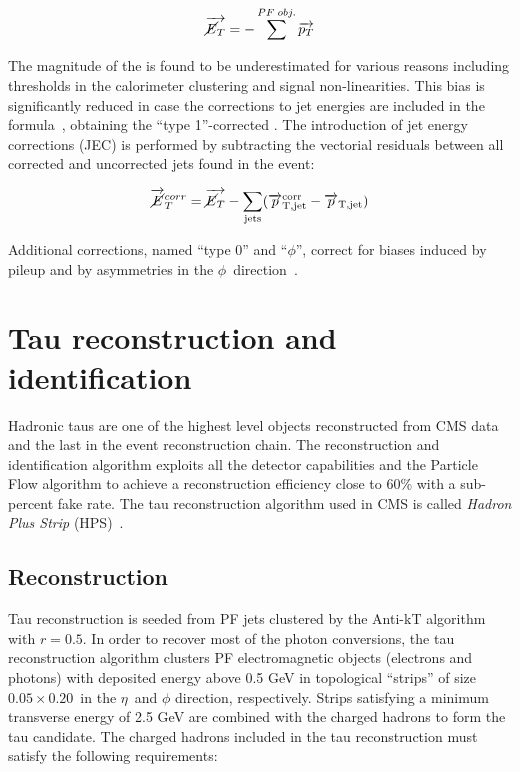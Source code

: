 \begin{equation}
\vec{\cancel{E}_T} = -\sum^{PF\;obj.} \vec{p_{T}}
\end{equation}

The magnitude of the \MET is found to be underestimated for various reasons including thresholds in the calorimeter clustering and signal non-linearities. This bias is significantly reduced in case the corrections to jet energies are included in the formula~\cite{Chatrchyan:2011ds}, obtaining the ``type 1''-corrected \MET. The introduction of jet energy corrections (JEC) is performed by subtracting the vectorial residuals between all corrected and uncorrected jets found in the event:

\begin{equation}
\vec{\cancel{E}}_T^{corr} = \vec{\cancel{E}_T } - \sum_\mathrm{jets} (\vec{p}_\mathrm{T,jet}^\mathrm{corr}-\vec{p}_\mathrm{T,jet})
\label{eq:Type1MET}
\end{equation}

Additional corrections, named ``type 0'' and ``$\phi$'', correct for biases induced by pileup and by asymmetries in the $\phi$\ direction~\cite{AN-13-233}.

\section{Tau reconstruction and identification}
\label{sec:tau_id}

Hadronic taus are one of the highest level objects reconstructed from CMS data and the last in the event reconstruction chain. The reconstruction and identification algorithm exploits all the detector capabilities and the Particle Flow algorithm to achieve a reconstruction efficiency close to 60\% with a sub-percent fake rate. The tau reconstruction algorithm used in CMS is called \emph{Hadron Plus Strip} (HPS)~\cite{CMS-PAS-TAU-11-001,AN-14-008}. 

\subsection{Reconstruction}

Tau reconstruction is seeded from PF jets clustered by the Anti-kT algorithm with $r = 0.5$. In order to recover most of the photon conversions, the tau reconstruction algorithm clusters PF electromagnetic objects (electrons and photons) with deposited energy above 0.5 GeV in topological ``strips'' of size $0.05 \times 0.20$\ in the $\eta$\ and $\phi$ direction, respectively. Strips satisfying a minimum transverse energy of 2.5 GeV are combined with the charged hadrons to form the tau candidate. The charged hadrons included in the tau reconstruction must satisfy the following requirements:

